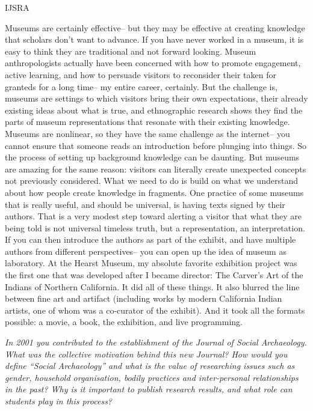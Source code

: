 \begin{labeling}{IJSRA}
\item[RAJ] Museums are certainly effective-- but they may be effective at creating knowledge that scholars don't want to advance. If you have never worked in a museum, it is easy to think they are traditional and not forward looking. Museum anthropologists actually have been concerned with how to promote engagement, active learning, and how to persuade visitors to reconsider their taken for granteds for a long time-- my entire career, certainly. But the challenge is, museums are settings to which visitors bring their own expectations, their already existing ideas about what is true, and ethnographic research shows they find the parts of museum representations that resonate with their existing knowledge. Museums are nonlinear, so they have the same challenge as the internet-- you cannot ensure that someone reads an introduction before plunging into things. So the process of setting up background knowledge can be daunting. But museums are amazing for the same reason: visitors can literally create unexpected concepts not previously considered. What we need to do is build on what we understand about how people create knowledge in fragments. One practice of some museums that is really useful, and should be universal, is having texts signed by their authors. That is a very modest step toward alerting a visitor that what they are being told is not universal timeless truth, but a representation, an interpretation. If you can then introduce the authors as part of the exhibit, and have multiple authors from different perspectives-- you can open up the idea of museum as laboratory. At the Hearst Museum, my absolute favorite exhibition project was the first one that was developed after I became director: The Carver's Art of the Indians of Northern California. It did all of these things. It also blurred the line between fine art and artifact (including works by modern California Indian artists, one of whom was a co-curator of the exhibit). And it took all the formats possible: a movie, a book, the exhibition, and live programming.	

\item[IJSRA] \textit{In 2001 you contributed to the establishment of the Journal of Social Archaeology. What was the collective motivation behind this new Journal? How would you define “Social Archaeology” and what is the value of researching issues such as gender, household organisation, bodily practices and inter-personal relationships in the past? Why is it important to publish research results, and what role can students play in this process?}


\end{labeling}
